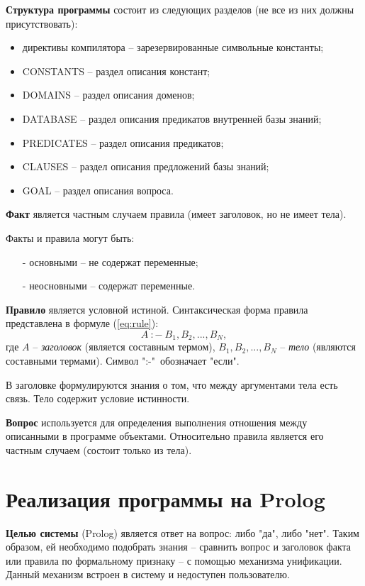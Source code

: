 \textbf{Структура программы} состоит из следующих разделов (не все из них должны присутствовать):
\begin{itemize}
	\item директивы компилятора -- зарезервированные символьные константы;
	\item CONSTANTS -- раздел описания констант;
	\item DOMAINS -- раздел описания доменов;
	\item DATABASE -- раздел описания предикатов внутренней базы знаний;
	\item PREDICATES -- раздел описания предикатов;
	\item CLAUSES -- раздел описания предложений базы знаний;
	\item GOAL -- раздел описания вопроса.
\end{itemize}

\textbf{Факт} является частным случаем правила (имеет заголовок, но не имеет тела).

Факты и правила могут быть:
\begin{spacing}{0.7}
	\begin{itemize}
		\item[-] основными -- не содержат переменные;
		\item[-] неосновными -- содержат переменные. 
	\end{itemize}
\end{spacing}

\textbf{Правило} является условной истиной. Синтаксическая форма правила представлена в формуле (\ref{eq:rule}):
\begin{equation}
	\label{eq:rule}
	A\ :-\ B_{1}, B_{2},...,B_{N},
\end{equation}
где $A$ -- \textit{заголовок} (является составным термом), $B_{1}, B_{2},...,B_{N}$ -- \textit{тело} (являются составными термами). Символ ":-"\ обозначает "если".

В заголовке формулируются знания о том, что между аргументами тела есть связь. Тело содержит условие истинности.

\textbf{Вопрос} используется для определения выполнения отношения между описанными в программе объектами. Относительно правила является его частным случаем (состоит только из тела).

\section{Реализация программы на Prolog}
\textbf{Целью системы} (Prolog) является ответ на вопрос: либо "да", либо "нет". Таким образом, ей необходимо подобрать знания -- сравнить вопрос и заголовок факта или правила по формальному признаку -- с помощью механизма унификации. Данный механизм встроен в систему и недоступен пользователю.

